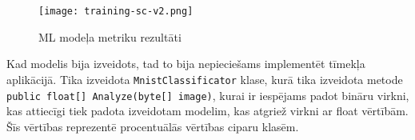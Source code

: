     \begin{figure}[H]
        \centering
        \texttt{[image: training-sc-v2.png]}
        \caption{ML modeļa metriku rezultāti}
        \label{ml:metrics}
    \end{figure}

    Kad modelis bija izveidots, tad to bija nepieciešams implementēt tīmekļa aplikācijā. Tika izveidota
    \texttt{MnistClassificator} klase, kurā tika izveidota metode \texttt{public float[] Analyze(byte[] image)},
    kurai ir iespējams padot bināru virkni, kas attiecīgi tiek padota izveidotam modelim, kas atgriež
    virkni ar float vērtībām. Šīs vērtības reprezentē procentuālās vērtības ciparu klasēm.
